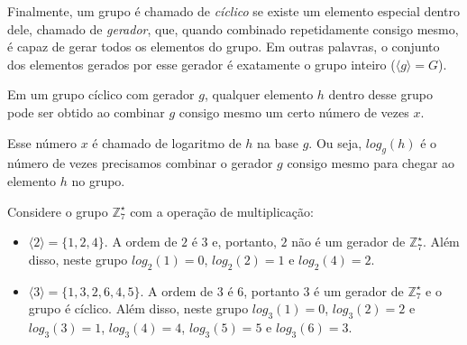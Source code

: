 Finalmente, um grupo é chamado de {\em cíclico} se existe um elemento especial dentro dele, chamado de {\em gerador}, que, quando combinado repetidamente consigo mesmo, é capaz de gerar todos os elementos do grupo.
Em outras palavras, o conjunto dos elementos gerados por esse gerador é exatamente o grupo inteiro ($\langle g \rangle = G$).

Em um grupo cíclico com gerador $g$, qualquer elemento $h$ dentro desse grupo pode ser obtido ao combinar $g$ consigo mesmo um certo número de vezes $x$.

Esse número $x$ é chamado de logaritmo de $h$ na base $g$.
Ou seja, $log_g(h)$ é o número de vezes precisamos combinar o gerador $g$ consigo mesmo para chegar ao elemento $h$ no grupo.

\begin{example}
Considere o grupo $\mathbb{Z}_7^\star$ com a operação de multiplicação:
\begin{itemize}
\item $\langle 2 \rangle = \{1, 2, 4\}$.
  A ordem de $2$ é $3$ e, portanto, $2$ não é um gerador de $\mathbb{Z}_7^\star$.
  Além disso, neste grupo $log_2(1) = 0$, $log_2(2) = 1$ e $log_2(4) = 2$.
\item $\langle 3 \rangle = \{1, 3, 2, 6, 4, 5\}$.
  A ordem de $3$ é $6$, portanto $3$ é um gerador de $\mathbb{Z}_7^\star$ e o grupo é cíclico.
Além disso, neste grupo $log_3(1) = 0$, $log_3(2) = 2$ e $log_3(3) = 1$, $log_3(4)= 4$, $log_3(5) = 5$ e $log_3(6) = 3$.
\end{itemize}
\end{example}


